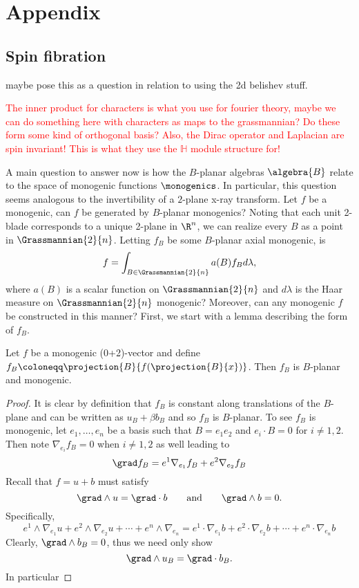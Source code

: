 \appendix
\section{Appendix}


\subsection{Spin fibration}
maybe pose this as a question in relation to using the 2d belishev stuff.

\textcolor{red}{The inner product for characters is what you use for fourier theory, maybe we can do something here with characters as maps to the grassmannian? Do these form some kind of orthogonal basis? Also, the Dirac operator and Laplacian are spin invariant! This is what they use the $\mathbb{H}$ module structure for!}

A main question to answer now is how the $B$-planar algebras $\algebra{B}$ relate to the space of monogenic functions $\monogenics$.  In particular, this question seems analogous to the invertibility of a $2$-plane x-ray transform.  Let $f$ be a monogenic, can $f$ be generated by $B$-planar monogenics? Noting that each unit 2-blade corresponds to a unique 2-plane in $\R^n$, we can realize every $B$ as a point in $\Grassmannian{2}{n}$.  Letting $f_B$ be some $B$-planar axial monogenic, is
\[
f = \int_{B \in \Grassmannian{2}{n}} a(B) f_B d \lambda,
\]
where $a(B)$ is a scalar function on $\Grassmannian{2}{n}$ and $d\lambda$ is the Haar measure on $\Grassmannian{2}{n}$ monogenic? Moreover, can any monogenic $f$ be constructed in this manner? First, we start with a lemma describing the form of $f_B$.


\begin{lemma}
    Let $f$ be a monogenic (0+2)-vector and define $f_B \coloneqq \projection{B}{f(\projection{B}{x})}$. Then $f_B$ is $B$-planar and monogenic.  
\end{lemma}
\begin{proof}
    It is clear by definition that $f_B$ is constant along translations of the $B$-plane and can be written as $u_B+\beta b_B$ and so $f_B$ is $B$-planar.  To see $f_B$ is monogenic, let $e_1,\dots,e_n$ be a basis such that $B=e_1e_2$ and $e_i \cdot B = 0$ for $i\neq 1,2$. Then note $\nabla_{e_i} f_B =0$ when $i\neq 1,2$ as well leading to
    \[
        \grad f_B = e^1 \nabla_{e_1}f_B + e^2 \nabla_{e_2}f_B
    \]
    Recall that $f=u+b$ must satisfy
    \[
        \grad \wedge u = \grad \cdot b \qquad \textrm{and} \qquad \grad \wedge b = 0.
    \]
    Specifically,
    \[
        e^1 \wedge \nabla_{e_1} u + e^2 \wedge \nabla_{e_2}u + \cdots + e^n \wedge \nabla_{e_n} = e^1 \cdot \nabla_{e_1} b + e^2 \cdot \nabla_{e_2}b + \cdots + e^n \cdot \nabla_{e_n} b
    \]
    Clearly, $\grad \wedge b_B = 0$, thus we need only show
    \[
        \grad \wedge u_B = \grad \cdot b_B.
    \]
    In particular
\end{proof}


